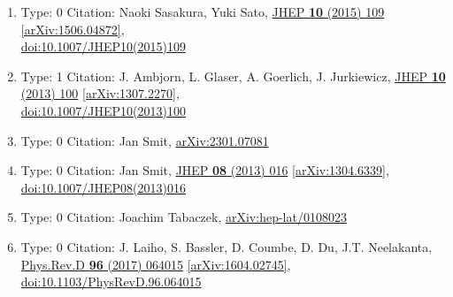 \documentclass[a4paper,10pt]{article}
\begin{document}
\begin{enumerate}
\begin{enumerate}
  \item Type: 0 Citation: Naoki Sasakura, Yuki Sato, \href{https://www.doi.org/10.1007/JHEP10(2015)109}{JHEP {\bf 10} (2015) 109}  \href{https://arxiv.org/abs/1506.04872}{[arXiv:1506.04872]},\\\href{https://www.doi.org/10.1007/JHEP10(2015)109}{doi:10.1007/JHEP10(2015)109}
  \item Type: 1 Citation: J. Ambjorn, L. Glaser, A. Goerlich, J. Jurkiewicz, \href{https://www.doi.org/10.1007/JHEP10(2013)100}{JHEP {\bf 10} (2013) 100}  \href{https://arxiv.org/abs/1307.2270}{[arXiv:1307.2270]},\\\href{https://www.doi.org/10.1007/JHEP10(2013)100}{doi:10.1007/JHEP10(2013)100}
  \item Type: 0 Citation: Jan Smit, \href{https://arxiv.org/abs/2301.07081}{arXiv:2301.07081}
  \item Type: 0 Citation: Jan Smit, \href{https://www.doi.org/10.1007/JHEP08(2013)016}{JHEP {\bf 08} (2013) 016}  \href{https://arxiv.org/abs/1304.6339}{[arXiv:1304.6339]},\\\href{https://www.doi.org/10.1007/JHEP08(2013)016}{doi:10.1007/JHEP08(2013)016}
  \item Type: 0 Citation: Joachim Tabaczek, \href{https://arxiv.org/abs/hep-lat/0108023}{arXiv:hep-lat/0108023}
  \item Type: 0 Citation: J. Laiho, S. Bassler, D. Coumbe, D. Du, J.T. Neelakanta, \href{https://www.doi.org/10.1103/PhysRevD.96.064015}{Phys.Rev.D {\bf 96} (2017) 064015}  \href{https://arxiv.org/abs/1604.02745}{[arXiv:1604.02745]},\\\href{https://www.doi.org/10.1103/PhysRevD.96.064015}{doi:10.1103/PhysRevD.96.064015}

\end{enumerate}
\end{enumerate}
\end{document}
